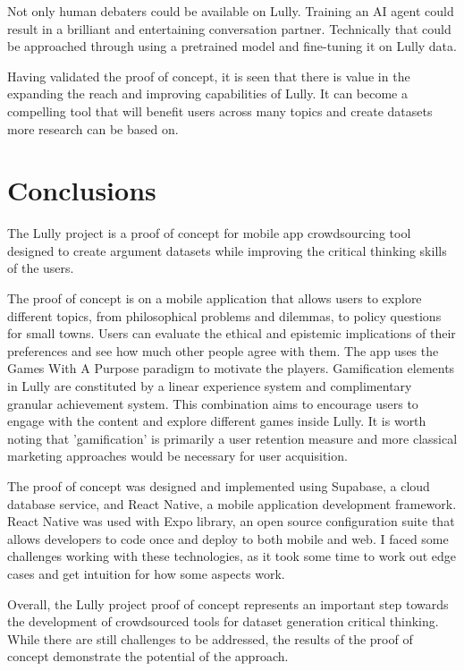 \documentclass{report}
\begin{document}
Not only human debaters could be available on Lully. Training an AI agent could result in a brilliant and entertaining conversation partner. Technically that could be approached through using a pretrained model and fine-tuning it on Lully data.

Having validated the proof of concept, it is seen that there is value in the expanding the reach and improving capabilities of Lully. It can become a compelling tool that will benefit users across many topics and create datasets more research can be based on.


\chapter{Conclusions}

The Lully project is a proof of concept for mobile app crowdsourcing tool designed to create argument datasets while improving the critical thinking skills of the users. 

The proof of concept is on a mobile application that allows users to explore different topics, from philosophical problems and dilemmas, to policy questions for small towns. Users can evaluate the ethical and epistemic implications of their preferences and see how much other people agree with them. The app uses the Games With A Purpose paradigm to motivate the players. Gamification elements in Lully are constituted by a linear experience system and complimentary granular achievement system. This combination aims to encourage users to engage with the content and explore different games inside Lully. It is worth noting that 'gamification' is primarily a user retention measure and more classical marketing approaches would be necessary for user acquisition.

The proof of concept was designed and implemented using Supabase, a cloud database service, and React Native, a mobile application development framework. React Native was used with Expo library, an open source configuration suite that allows developers to code once and deploy to both mobile and web. I faced some challenges working with these technologies, as it took some time to work out edge cases and get intuition for how some aspects work.


Overall, the Lully project proof of concept represents an important step towards the development of crowdsourced tools for dataset generation critical thinking. While there are still challenges to be addressed, the results of the proof of concept demonstrate the potential of the approach.


\printbibliography
\end{document}
